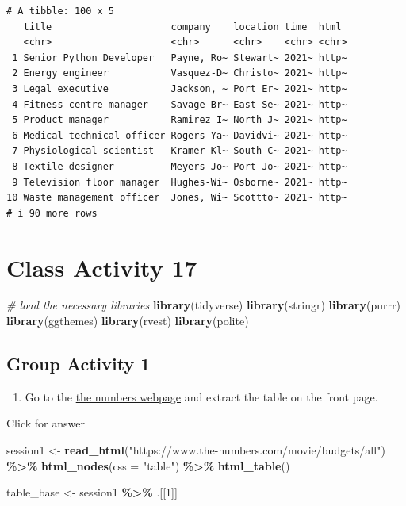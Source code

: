 \documentclass[
]{book}
\newenvironment{Shaded}{\begin{snugshade}}{\end{snugshade}}
\newcommand{\AttributeTok}[1]{\textcolor[rgb]{0.13,0.29,0.53}{#1}}
\newcommand{\CommentTok}[1]{\textcolor[rgb]{0.56,0.35,0.01}{\textit{#1}}}
\newcommand{\DecValTok}[1]{\textcolor[rgb]{0.00,0.00,0.81}{#1}}
\newcommand{\FunctionTok}[1]{\textcolor[rgb]{0.13,0.29,0.53}{\textbf{#1}}}
\newcommand{\NormalTok}[1]{#1}
\newcommand{\OtherTok}[1]{\textcolor[rgb]{0.56,0.35,0.01}{#1}}
\newcommand{\SpecialCharTok}[1]{\textcolor[rgb]{0.81,0.36,0.00}{\textbf{#1}}}
\newcommand{\StringTok}[1]{\textcolor[rgb]{0.31,0.60,0.02}{#1}}
\providecommand{\tightlist}{%
  \setlength{\itemsep}{0pt}\setlength{\parskip}{0pt}}
\begin{document}
\begin{verbatim}
# A tibble: 100 x 5
   title                     company    location time  html 
   <chr>                     <chr>      <chr>    <chr> <chr>
 1 Senior Python Developer   Payne, Ro~ Stewart~ 2021~ http~
 2 Energy engineer           Vasquez-D~ Christo~ 2021~ http~
 3 Legal executive           Jackson, ~ Port Er~ 2021~ http~
 4 Fitness centre manager    Savage-Br~ East Se~ 2021~ http~
 5 Product manager           Ramirez I~ North J~ 2021~ http~
 6 Medical technical officer Rogers-Ya~ Davidvi~ 2021~ http~
 7 Physiological scientist   Kramer-Kl~ South C~ 2021~ http~
 8 Textile designer          Meyers-Jo~ Port Jo~ 2021~ http~
 9 Television floor manager  Hughes-Wi~ Osborne~ 2021~ http~
10 Waste management officer  Jones, Wi~ Scottto~ 2021~ http~
# i 90 more rows
\end{verbatim}

\hypertarget{class-activity-17}{%
\chapter{Class Activity 17}\label{class-activity-17}}

\begin{Shaded}
\begin{Highlighting}[]
\CommentTok{\# load the necessary libraries}
\FunctionTok{library}\NormalTok{(tidyverse)}
\FunctionTok{library}\NormalTok{(stringr)}
\FunctionTok{library}\NormalTok{(purrr)}
\FunctionTok{library}\NormalTok{(ggthemes)}
\FunctionTok{library}\NormalTok{(rvest)}
\FunctionTok{library}\NormalTok{(polite)}
\end{Highlighting}
\end{Shaded}

\hypertarget{group-activity-1-4}{%
\section{Group Activity 1}\label{group-activity-1-4}}

\begin{enumerate}
\def\labelenumi{\arabic{enumi}.}
\tightlist
\item
  Go to the \href{https://www.the-numbers.com/movie/budgets/all}{the numbers webpage} and extract the table on the front page.
\end{enumerate}

Click for answer

\begin{Shaded}
\begin{Highlighting}[]
\NormalTok{session1 }\OtherTok{\textless{}{-}} \FunctionTok{read\_html}\NormalTok{(}\StringTok{"https://www.the{-}numbers.com/movie/budgets/all"}\NormalTok{) }\SpecialCharTok{\%\textgreater{}\%}
  \FunctionTok{html\_nodes}\NormalTok{(}\AttributeTok{css =} \StringTok{"table"}\NormalTok{) }\SpecialCharTok{\%\textgreater{}\%}
  \FunctionTok{html\_table}\NormalTok{()}

\NormalTok{table\_base }\OtherTok{\textless{}{-}}\NormalTok{ session1 }\SpecialCharTok{\%\textgreater{}\%}\NormalTok{ .[[}\DecValTok{1}\NormalTok{]]}
\end{Highlighting}
\end{Shaded}
\end{document}
